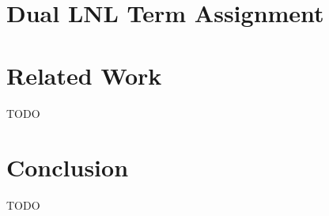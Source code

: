 \documentclass{lmcs}
\begin{document}
\section{Dual LNL Term Assignment}
\label{sec:dual_lnl_term_assignment}



\section{Related Work}
\label{sec:related_work}
TODO


\section{Conclusion}
\label{sec:conclusion}
TODO

 

\appendix

\end{document}
